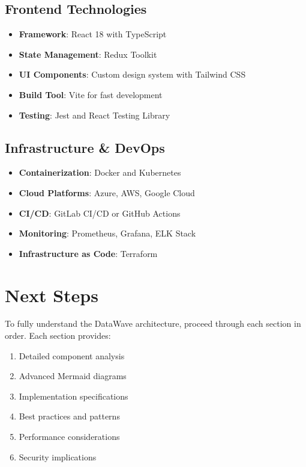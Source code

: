 \documentclass[12pt,a4paper]{article}
\begin{document}
\subsection{Frontend Technologies}
\begin{itemize}
    \item \textbf{Framework}: React 18 with TypeScript
    \item \textbf{State Management}: Redux Toolkit
    \item \textbf{UI Components}: Custom design system with Tailwind CSS
    \item \textbf{Build Tool}: Vite for fast development
    \item \textbf{Testing}: Jest and React Testing Library
\end{itemize}

\subsection{Infrastructure \& DevOps}
\begin{itemize}
    \item \textbf{Containerization}: Docker and Kubernetes
    \item \textbf{Cloud Platforms}: Azure, AWS, Google Cloud
    \item \textbf{CI/CD}: GitLab CI/CD or GitHub Actions
    \item \textbf{Monitoring}: Prometheus, Grafana, ELK Stack
    \item \textbf{Infrastructure as Code}: Terraform
\end{itemize}

\section{Next Steps}

To fully understand the DataWave architecture, proceed through each section in order. Each section provides:

\begin{enumerate}
    \item Detailed component analysis
    \item Advanced Mermaid diagrams
    \item Implementation specifications
    \item Best practices and patterns
    \item Performance considerations
    \item Security implications
\end{enumerate}
\end{document}
